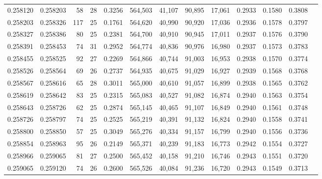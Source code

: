 \begin{tabular}{rrrrrrrrrrrrr}
0.258120 & 0.258203 &  58 &  28 &                                     0.3256 & 564,503 &  41,107 &  90,895 &  17,061 & 0.2933 & 0.1580 & 0.3808 \\
0.258203 & 0.258326 & 117 &  25 &                                     0.1761 & 564,620 &  40,990 &  90,920 &  17,036 & 0.2936 & 0.1578 & 0.3797 \\
0.258327 & 0.258386 &  80 &  25 &                                     0.2381 & 564,700 &  40,910 &  90,945 &  17,011 & 0.2937 & 0.1576 & 0.3790 \\
0.258391 & 0.258453 &  74 &  31 &                                     0.2952 & 564,774 &  40,836 &  90,976 &  16,980 & 0.2937 & 0.1573 & 0.3783 \\
0.258455 & 0.258525 &  92 &  27 &                                     0.2269 & 564,866 &  40,744 &  91,003 &  16,953 & 0.2938 & 0.1570 & 0.3774 \\
0.258526 & 0.258564 &  69 &  26 &                                     0.2737 & 564,935 &  40,675 &  91,029 &  16,927 & 0.2939 & 0.1568 & 0.3768 \\
0.258567 & 0.258616 &  65 &  28 &                                     0.3011 & 565,000 &  40,610 &  91,057 &  16,899 & 0.2938 & 0.1565 & 0.3762 \\
0.258619 & 0.258642 &  83 &  25 &                                     0.2315 & 565,083 &  40,527 &  91,082 &  16,874 & 0.2940 & 0.1563 & 0.3754 \\
0.258643 & 0.258726 &  62 &  25 &                                     0.2874 & 565,145 &  40,465 &  91,107 &  16,849 & 0.2940 & 0.1561 & 0.3748 \\
0.258726 & 0.258797 &  74 &  25 &                                     0.2525 & 565,219 &  40,391 &  91,132 &  16,824 & 0.2940 & 0.1558 & 0.3741 \\
0.258800 & 0.258850 &  57 &  25 &                                     0.3049 & 565,276 &  40,334 &  91,157 &  16,799 & 0.2940 & 0.1556 & 0.3736 \\
0.258854 & 0.258963 &  95 &  26 &                                     0.2149 & 565,371 &  40,239 &  91,183 &  16,773 & 0.2942 & 0.1554 & 0.3727 \\
0.258966 & 0.259065 &  81 &  27 &                                     0.2500 & 565,452 &  40,158 &  91,210 &  16,746 & 0.2943 & 0.1551 & 0.3720 \\
0.259065 & 0.259120 &  74 &  26 &                                     0.2600 & 565,526 &  40,084 &  91,236 &  16,720 & 0.2943 & 0.1549 & 0.3713 \\

\end{tabular}
